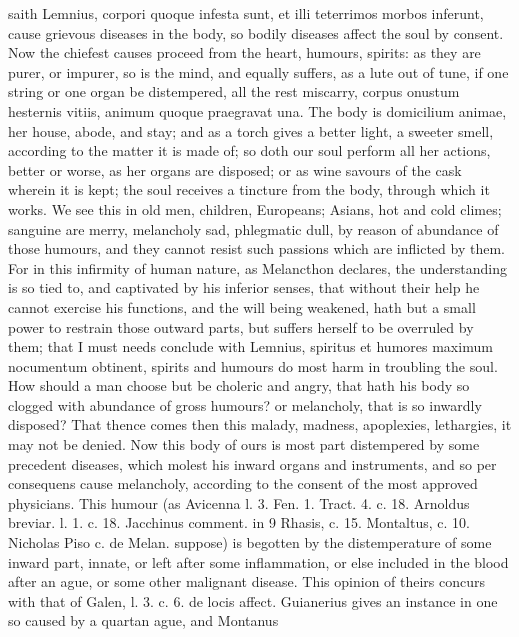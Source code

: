 {saith Lemnius, corpori quoque infesta sunt, et illi teterrimos
morbos inferunt, cause grievous diseases in the body, so bodily
diseases affect the soul by consent. Now the chiefest causes proceed
from the heart, humours, spirits: as they are purer, or impurer,
so is the mind, and equally suffers, as a lute out of tune, if one
string or one organ be distempered, all the rest miscarry, corpus
onustum hesternis vitiis, animum quoque praegravat una. The body is
domicilium animae, her house, abode, and stay; and as a torch gives a
better light, a sweeter smell, according to the matter it is made of;
so doth our soul perform all her actions, better or worse, as her
organs are disposed; or as wine savours of the cask wherein it is kept;
the soul receives a tincture from the body, through which it works. We
see this in old men, children, Europeans; Asians, hot and cold climes;
sanguine are merry, melancholy sad, phlegmatic dull, by reason of
abundance of those humours, and they cannot resist such passions which
are inflicted by them. For in this infirmity of human nature, as
Melancthon declares, the understanding is so tied to, and captivated by
his inferior senses, that without their help he cannot exercise his
functions, and the will being weakened, hath but a small power to
restrain those outward parts, but suffers herself to be overruled by
them; that I must needs conclude with Lemnius, spiritus et humores
maximum nocumentum obtinent, spirits and humours do most harm in
troubling the soul. How should a man choose but be choleric and
angry, that hath his body so clogged with abundance of gross humours?
or melancholy, that is so inwardly disposed? That thence comes then
this malady, madness, apoplexies, lethargies, \etc{} it may not be denied.
Now this body of ours is most part distempered by some precedent
diseases, which molest his inward organs and instruments, and so per
consequens cause melancholy, according to the consent of the most
approved physicians. This humour (as Avicenna l. 3. Fen. 1.
Tract. 4. c. 18. Arnoldus breviar. l. 1. c. 18. Jacchinus comment. in 9
Rhasis, c. 15. Montaltus, c. 10. Nicholas Piso c. de Melan. \etc{}
suppose) is begotten by the distemperature of some inward part, innate,
or left after some inflammation, or else included in the blood after an
ague, or some other malignant disease. This opinion of theirs
concurs with that of Galen, \textlatin{l. 3. c. 6. de locis affect}. Guianerius
gives an instance in one so caused by a quartan ague, and Montanus
}
